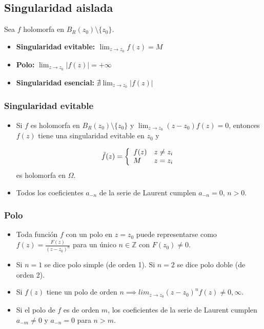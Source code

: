 \documentclass[paper=a4, fontsize=11pt]{scrartcl}
\numberwithin{equation}{section}
\numberwithin{figure}{section}
\numberwithin{table}{section}
\begin{document}
\subsection{Singularidad aislada}

Sea $f$ holomorfa en $B_R(z_0)\setminus\{z_0\}$.

\begin{itemize}

\item \textbf{Singularidad evitable: $\lim_{z\to z_0}f(z) = M$}
\item \textbf{Polo:} $\lim_{z\to z_0}|f(z)| = +\infty$
\item \textbf{Singularidad esencial:} $\nexists \lim_{z\to z_0}\left|f(z)\right|$
\end{itemize}

\subsubsection{Singularidad evitable}
\begin{itemize}
\item Si $f$ es holomorfa en $B_R(z_0)\setminus\{z_0\}$ y $\lim_{z\to z_0} (z-z_0)f(z) = 0$, entonces $f(z)$ tiene una singularidad evitable en $z_0$ y

$$ \tilde{f}(z) = 
\left\{
\begin{array}{l l}
f(z) & z\neq z_i\\
M  & z=z_i
\end{array}
\right.$$
es holomorfa en $\Omega$.

\item Todos los coeficientes $a_{-n}$ de la serie de Laurent cumplen $a_{-n}=0$, $n>0$.
\end{itemize}


\subsubsection{Polo}
\begin{itemize}
\item Toda función $f$ con un polo en $z=z_0$ puede representarse como $f(z) = \frac{F(z)}{(z-z_0)^n}$ para un único $n\in \mathbb{Z}$ con $F(z_0)\neq 0$. 

\item Si $n=1$ se dice polo simple (de orden 1). Si $n=2$ se dice polo doble (de orden 2).

\item Si $f(z)$ tiene un polo de orden $n \implies lim_{z\to z_0} (z-z_0)^nf(z) \neq 0, \infty$.

\item Si el polo de $f$ es de orden $m$, los coeficientes de la serie de Laurent cumplen $a_{-m}\neq0$ y $a_{-n}=0$ para $n>m$.
\end{itemize}
\end{document}
